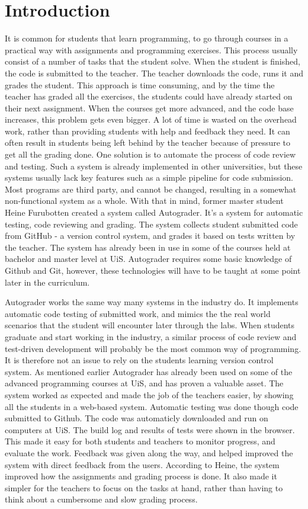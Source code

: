 \chapter*{Introduction}

It is common for students that learn programming, to go through courses in a practical way with assignments and programming exercises. This process usually consist of a number of tasks that the student solve. When the student is finished, the code is submitted to the teacher. The teacher downloads the code, runs it and grades the student. This approach is time consuming, and by the time the teacher has graded all the exercises, the students could have already started on their next assignment. When the courses get more advanced, and the code base increases, this problem gets even bigger. A lot of time is wasted on the overhead work, rather than providing students with help and feedback they need. It can often result in students being left behind by the teacher because of pressure to get all the grading done. One solution is to automate the process of code review and testing. Such a system is already implemented in other universities, but these systems usually lack key features such as a simple pipeline for code submission. Most programs are third party, and cannot be changed, resulting in a somewhat non-functional system as a whole. With that in mind, former master student Heine Furubotten created a system called Autograder. It's a system for automatic testing, code reviewing and grading. The system collects student submitted code from GitHub - a version control system, and grades it based on tests written by the teacher. The system has already been in use in some of the courses held at bachelor and master level at UiS. Autograder requires some basic knowledge of Github and Git, however, these technologies will have to be taught at some point later in the curriculum.

Autograder works the same way many systems in the industry do. It implements automatic code testing of submitted work, and mimics the the real world scenarios that the student will encounter later through the labs. When students graduate and start working in the industry, a similar process of code review and test-driven development will probably be the most common way of programming. It is therefore not an issue to rely on the students learning version control system. As mentioned earlier Autograder has already been used on some of the advanced programming courses at UiS, and has proven a valuable asset. The system worked as expected and made the job of the teachers easier, by showing all the students in a web-based system. Automatic testing was done though code submitted to Github. The code was automaticly downloaded and run on computers at UiS. The build log and results of tests were shown in the  browser. This made it easy for both students and teachers to monitor progress, and evaluate the work. Feedback was given along the way, and helped improved the system with direct feedback from the users. According to Heine, the system improved how the assignments and grading process is done. It also made it simpler for the teachers to focus on the tasks at hand, rather than having to think about a cumbersome and slow grading process.

